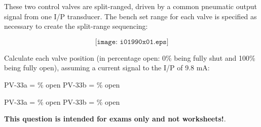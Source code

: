 

These two control valves are split-ranged, driven by a common pneumatic output signal from one I/P transducer.  The bench set range for each valve is specified as necessary to create the split-range sequencing:

$$\texttt{[image: i01990x01.eps]}$$

Calculate each valve position (in percentage open: 0\% being fully shut and 100\% being fully open), assuming a current signal to the I/P of 9.8 mA:

\vskip 20pt

\hskip 50pt PV-33a = \underbar{\hskip 50pt} \% open \hskip 60pt PV-33b = \underbar{\hskip 50pt} \% open







PV-33a =  \% open \hskip 100pt PV-33b =  \% open







{\bf This question is intended for exams only and not worksheets!}.


